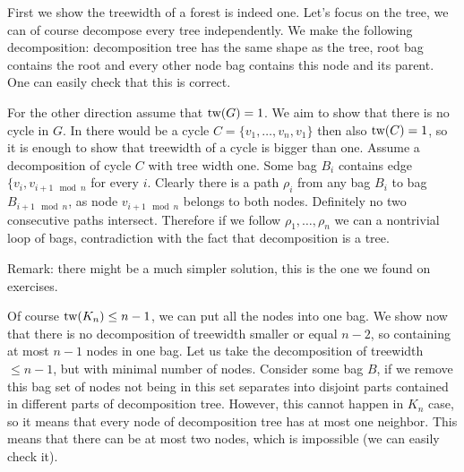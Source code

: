 

{
First we show the treewidth of a forest is indeed one. Let's focus on the tree,
we can of course decompose every tree independently. We make the following decomposition:
decomposition tree has the same shape as the tree, root bag contains the root and every other
node bag contains this node and its parent. One can easily check that this is correct.

For the other direction assume that $\textup{tw}(G) = 1$. We aim to show that there is no cycle in $G$.
In there would be a cycle $C = \{v_1, \ldots, v_n, v_1\}$ then also $\textup{tw}(C) = 1$, so it is enough to show
that treewidth of a cycle is bigger than one. Assume a decomposition of cycle $C$ with tree width one.
Some bag $B_i$ contains edge $\{v_i, v_{i+1 \mod n}$ for every $i$. Clearly there is a path $\rho_i$ from
any bag $B_i$ to bag $B_{i+1 \mod n}$, as node $v_{i+1 \mod n}$ belongs to both nodes. Definitely no two consecutive
paths intersect. Therefore if we follow $\rho_1, \ldots, \rho_n$ we can a nontrivial loop of bags, contradiction with
the fact that decomposition is a tree.

Remark: there might be a much simpler solution, this is the one we found on exercises.
}




{
Of course $\textup{tw}(K_n) \leq n-1$, we can put all the nodes into one bag. We show now that there is no decomposition
of treewidth smaller or equal $n-2$, so containing at most $n-1$ nodes in one bag.
Let us take the decomposition of treewidth $\leq n-1$, but with minimal number of nodes.
Consider some bag $B$, if we remove this bag set of nodes not being in this set separates into
disjoint parts contained in different parts of decomposition tree. However, this cannot happen in $K_n$ case,
so it means that every node of decomposition tree has at most one neighbor. This means that there can
be at most two nodes, which is impossible (we can easily check it).
}




